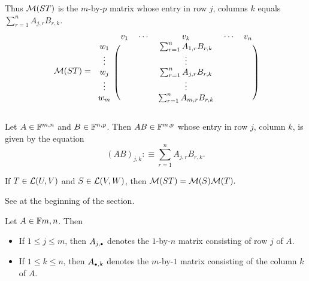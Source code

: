 Thus $\mathcal{M}(ST)$ is the $m$-by-$p$ matrix whose entry in row $j$, columns $k$ equals $\sum_{r=1}^{n} A_{j,r}  B_{r,k}$.
\begin{equation}
  \mathcal{M} (ST) =
  \begin{blockarray}{cccccc}
             & v_1 & \cdots &  v_k      & \cdots & v_n \\
    \begin{block}{c(ccccc)}
      w_1    &     &        &  
        \sum_{r=1}^{n} A_{1,r}  B_{r,k} &        &     \\
      \vdots &     &        &  \vdots   &        &     \\
      w_j    &     &        &  
        \sum_{r=1}^{n} A_{j,r}  B_{r,k} &        &     \\
      \vdots &     &        &  \vdots   &        &     \\
      w_m    &     &        &  
        \sum_{r=1}^{n} A_{m,r}  B_{r,k} &        &     \\
    \end{block}
  \end{blockarray}
\end{equation}

\setcounter{thm}{40}
\begin{mydef} 
  \label{def: matrix multiplication}
  Let $A \in \mathbb{F}^{m,n}$ and $B \in \mathbb{F}^{n,p}$. Then $AB \in \mathbb{F}^{m,p}$ whose entry in row $j$, column $k$, is given by the equation
  \begin{equation}
    (AB)_{j,k} :\equiv \sum_{r=1}^{n} A_{j,r} B_{r,k}.
  \end{equation} %
\end{mydef}

\setcounter{thm}{42}
\begin{thm}
  If $T \in \mathcal{L}(U,V)$ and $S\in \mathcal{L}(V,W)$, then $\mathcal{M}(ST) = \mathcal{M}(S) \mathcal{M}(T).$
\end{thm}
\begin{prf}
  See at the beginning of the section.
\end{prf}

\begin{mydef}  Let $A\in \mathbb{F}{m,n}$. Then
  \begin{itemize}
    \item If $1 \leq j \leq m$, then $A_{j, \mathsmaller{\bullet}}$ denotes the $1$-by-$n$ matrix consisting of row $j$ of $A$. 
    \item If $1 \leq k \leq n$, then  $A_{\mathsmaller{\bullet}, k}$ denotes the $m$-by-$1$ matrix consisting of the column $k$ of $A$.
  \end{itemize}
\end{mydef}

